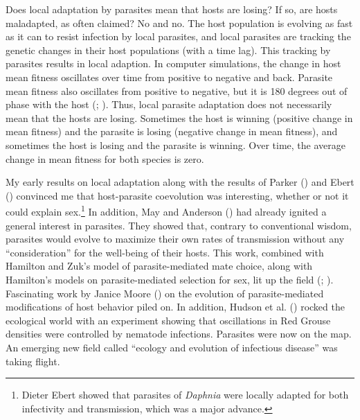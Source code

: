 \documentclass[
  american,
  letterpaper,
]{book}
\begin{document}
Does local adaptation by parasites mean that hosts are losing? If so,
are hosts maladapted, as often claimed? No and no. The host population
is evolving as fast as it can to resist infection by local parasites,
and local parasites are tracking the genetic changes in their host
populations (with a time lag). This tracking by parasites results in
local adaption. In computer simulations, the change in host mean fitness
oscillates over time from positive to negative and back. Parasite mean
fitness also oscillates from positive to negative, but it is 180 degrees
out of phase with the host (;
). Thus, local parasite
adaptation does not necessarily mean that the hosts are losing.
Sometimes the host is winning (positive change in mean fitness) and the
parasite is losing (negative change in mean fitness), and sometimes the
host is losing and the parasite is winning. Over time, the average
change in mean fitness for both species is zero.

My early results on local adaptation along with the results of Parker
() and Ebert
() convinced me that host-parasite
coevolution was interesting, whether or not it could explain
sex.\footnote{Dieter Ebert showed that parasites of \emph{Daphnia} were
  locally adapted for both infectivity and transmission, which was a
  major advance.} In addition, May and Anderson
() had already ignited a general interest
in parasites. They showed that, contrary to conventional wisdom,
parasites would evolve to maximize their own rates of transmission
without any ``consideration'' for the well-being of their hosts. This
work, combined with Hamilton and Zuk's model of parasite-mediated mate
choice, along with Hamilton's models on parasite-mediated selection for
sex, lit up the field (;
). Fascinating work by
Janice Moore () on the evolution of
parasite-mediated modifications of host behavior piled on. In addition,
Hudson et al. () rocked the ecological
world with an experiment showing that oscillations in Red Grouse
densities were controlled by nematode infections. Parasites were now on
the map. An emerging new field called ``ecology and evolution of
infectious disease'' was taking flight.
\end{document}
